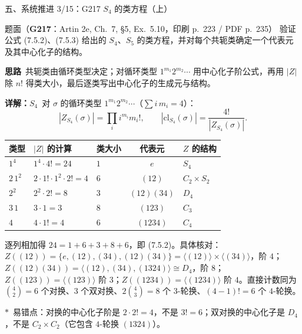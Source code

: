 \documentclass[aspectratio=169,10pt,fontset=none]{ctexbeamer}
\newcommand{\ex}[1]{\textcolor{accent}{\footnotesize\bfseries #1}}
\newcommand{\key}[1]{\textcolor{ink}{\bfseries #1}}
\newcommand{\starpt}{\textcolor{accent}{\bfseries$\ast$}}
\begin{document}
\begin{frame}[t]{五、系统推进 3/15：G217 $S_4$ 的类方程（上）}
\label{ex:G217}
\scriptsize
\begin{block}{\footnotesize 题面（\ex{G217}：Artin 2e, Ch.~7, \S5, Ex.~5.10，印刷 p.~223 / PDF p.~235）}
验证公式 (7.5.2)、(7.5.3) 给出的 $S_4$、$S_5$ 的类方程，并对每个共轭类确定一个代表元及其中心化子的结构。
\end{block}
\vspace{-0.6mm}
\key{思路}\ 共轭类由循环类型决定；对循环类型 $1^{m_1}2^{m_2}\cdots$ 用中心化子阶公式，再用 $|Z|$ 除 $n!$ 得类大小，最后逐类写出中心化子的生成元与结构。

\key{详解：$S_4$}\ 对 $\sigma$ 的循环类型 $1^{m_1}2^{m_2}\cdots$（$\sum i\,m_i=4$）：
\[
|Z_{S_4}(\sigma)|=\prod_i i^{m_i}m_i!,\qquad |\mathrm{cl}_{S_4}(\sigma)|=\frac{4!}{|Z_{S_4}(\sigma)|}.
\]
\begin{center}
\begin{tabular}{@{}lllcl@{}}
\toprule
类型 & $|Z|$ 的计算 & 类大小 & 代表元 & $Z$ 的结构\\
\midrule
$1^4$ & $1^4\cdot 4!=24$ & $1$ & $e$ & $S_4$\\
$2\,1^2$ & $2\cdot 1!\cdot 1^2\cdot 2!=4$ & $6$ & $(12)$ & $C_2\times S_2$\\
$2^2$ & $2^2\cdot 2!=8$ & $3$ & $(12)(34)$ & $D_4$\\
$3\,1$ & $3\cdot 1=3$ & $8$ & $(123)$ & $C_3$\\
$4$ & $4\cdot 1!=4$ & $6$ & $(1234)$ & $C_4$\\
\bottomrule
\end{tabular}
\end{center}
逐列相加得 $24=1+6+3+8+6$，即 (7.5.2)。具体核对：$Z((12))=\{e,(12),(34),(12)(34)\}=\langle(12)\rangle\times\langle(34)\rangle$，阶 $4$；$Z((12)(34))=\langle(12),(34),(1324)\rangle\cong D_4$，阶 $8$；$Z((123))=\langle(123)\rangle$ 阶 $3$；$Z((1234))=\langle(1234)\rangle$ 阶 $4$。直接计数同为 $\binom42=6$ 个对换、$3$ 个双对换、$2\binom43=8$ 个 $3$-轮换、$(4-1)!=6$ 个 $4$-轮换。

\starpt\ 易错点：对换的中心化子阶是 $2\cdot 2!=4$，不是 $3!=6$；双对换的中心化子是 $D_4$，不是 $C_2\times C_2$（它包含 $4$-轮换 $(1324)$）。
\end{frame}
\end{document}
